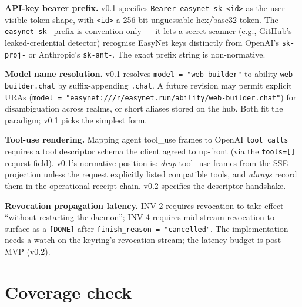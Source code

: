 \documentclass[11pt,a4paper]{article}
\theoremstyle{definition}
\begin{document}
\begin{decisionbox}
\textbf{API-key bearer prefix.} v0.1 specifies
\texttt{Bearer easynet-sk-<id>} as the user-visible token shape,
with \texttt{<id>} a 256-bit unguessable hex/base32 token. The
\texttt{easynet-sk-} prefix is convention only --- it lets a
secret-scanner (e.g., GitHub's leaked-credential detector)
recognise EasyNet keys distinctly from OpenAI's
\texttt{sk-proj-} or Anthropic's \texttt{sk-ant-}. The exact
prefix string is non-normative.
\end{decisionbox}

\begin{decisionbox}
\textbf{Model name resolution.} v0.1 resolves
\texttt{model = "web-builder"} to ability
\texttt{web-builder.chat} by suffix-appending \texttt{.chat}.
A future revision may permit explicit URAs (\texttt{model =
"easynet:///r/easynet.run/ability/web-builder.chat"}) for
disambiguation across realms, or short aliases stored on the
hub. Both fit the paradigm; v0.1 picks the simplest form.
\end{decisionbox}

\begin{decisionbox}
\textbf{Tool-use rendering.} Mapping agent tool\_use frames to
OpenAI \texttt{tool\_calls} requires a tool descriptor schema
the client agreed to up-front (via the \texttt{tools=[]}
request field). v0.1's normative position is: \emph{drop}
tool\_use frames from the SSE projection unless the request
explicitly listed compatible tools, and \emph{always} record
them in the operational receipt chain. v0.2 specifies the
descriptor handshake.
\end{decisionbox}

\begin{decisionbox}
\textbf{Revocation propagation latency.} INV-2 requires
revocation to take effect ``without restarting the daemon'';
INV-4 requires mid-stream revocation to surface as a
\texttt{[DONE]} after \texttt{finish\_reason = "cancelled"}.
The implementation needs a watch on the keyring's revocation
stream; the latency budget is post-MVP (v0.2).
\end{decisionbox}

\section{Coverage check}
\end{document}
